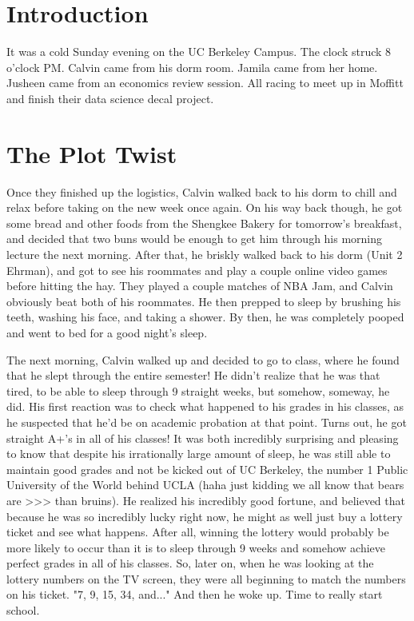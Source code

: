 \documentclass{article}
\begin{document}
\section{Introduction}

It was a cold Sunday evening on the UC Berkeley Campus. The clock struck 8
o'clock PM. Calvin came from his dorm room. Jamila came from her home.
Jusheen came from an economics review session. All racing to meet up in Moffitt
and finish their data science decal project.

\section{The Plot Twist}

Once they finished up the logistics, Calvin walked back to his dorm to chill and
relax before taking on the new week once again. On his way back though, he got
some bread and other foods from the Shengkee Bakery for tomorrow's breakfast, and
decided that two buns would be enough to get him through his morning lecture the
next morning. After that, he briskly walked back to his dorm (Unit 2 Ehrman), and
got to see his roommates and play a couple online video games before hitting the hay.
They played a couple matches of NBA Jam, and Calvin obviously beat both of his
roommates. He then prepped to sleep by brushing his teeth, washing his face, and
taking a shower. By then, he was completely pooped and went to bed for a good
night's sleep.

The next morning, Calvin walked up and decided to go to class, where he found
that he slept through the entire semester! He didn't realize that he was that tired,
to be able to sleep through 9 straight weeks, but somehow, someway, he did. His
first reaction was to check what happened to his grades in his classes, as he suspected
that he'd be on academic probation at that point. Turns out, he got straight A+'s in
all of his classes! It was both incredibly surprising and pleasing to know that
despite his irrationally large amount of sleep, he was still able to maintain good
grades and not be kicked out of UC Berkeley, the number 1 Public University of the World
behind UCLA (haha just kidding we all know that bears are >>> than bruins). He
realized his incredibly good fortune, and believed that because he was so incredibly
lucky right now, he might as well just buy a lottery ticket and see what happens.
After all, winning the lottery would probably be more likely to occur than it is to
sleep through 9 weeks and somehow achieve perfect grades in all of his classes.
So, later on, when he was looking at the lottery numbers on the TV screen, they were
all beginning to match the numbers on his ticket. "7, 9, 15, 34, and..." And then
he woke up. Time to really start school.
\end{document}
